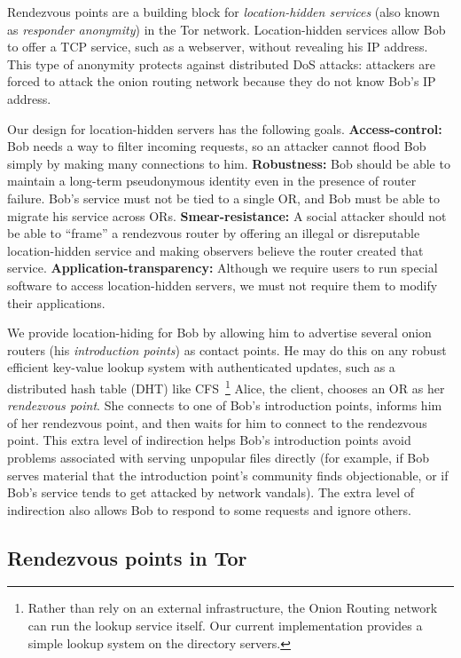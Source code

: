 \documentclass[twocolumn]{article}
\begin{document}
Rendezvous points are a building block for \emph{location-hidden
services} (also known as \emph{responder anonymity}) in the Tor
network.  Location-hidden services allow Bob to offer a TCP
service, such as a webserver, without revealing his IP address.
This type of anonymity protects against distributed DoS attacks:
attackers are forced to attack the onion routing network
because they do not know Bob's IP address.

Our design for location-hidden servers has the following goals.
\textbf{Access-control:} Bob needs a way to filter incoming requests,
so an attacker cannot flood Bob simply by making many connections to him.
\textbf{Robustness:} Bob should be able to maintain a long-term pseudonymous
identity even in the presence of router failure. Bob's service must
not be tied to a single OR, and Bob must be able to migrate his service
across ORs. \textbf{Smear-resistance:}
A social attacker
should not be able to ``frame'' a rendezvous router by
offering an illegal or disreputable location-hidden service and
making observers believe the router created that service.
\textbf{Application-transparency:} Although we require users
to run special software to access location-hidden servers, we must not
require them to modify their applications.

We provide location-hiding for Bob by allowing him to advertise
several onion routers (his \emph{introduction points}) as contact
points. He may do this on any robust efficient
key-value lookup system with authenticated updates, such as a
distributed hash table (DHT) like CFS~\cite{cfs:sosp01}\footnote{
Rather than rely on an external infrastructure, the Onion Routing network
can run the lookup service itself.  Our current implementation provides a
simple lookup system on the
directory servers.} Alice, the client, chooses an OR as her
\emph{rendezvous point}. She connects to one of Bob's introduction
points, informs him of her rendezvous point, and then waits for him
to connect to the rendezvous point. This extra level of indirection
helps Bob's introduction points avoid problems associated with serving
unpopular files directly (for example, if Bob serves
material that the introduction point's community finds objectionable,
or if Bob's service tends to get attacked by network vandals).
The extra level of indirection also allows Bob to respond to some requests
and ignore others.

\subsection{Rendezvous points in Tor}
\end{document}
